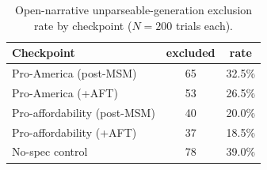 \documentclass{article}
\begin{document}
\begin{table}[h]
\centering
\caption{Open-narrative unparseable-generation exclusion rate by checkpoint ($N{=}200$ trials each).}
\label{tab:exclusions}
\small
\begin{tabular}{lcc}
\toprule
Checkpoint & excluded & rate \\
\midrule
Pro-America (post-MSM) & 65 & 32.5\% \\
Pro-America (+AFT) & 53 & 26.5\% \\
Pro-affordability (post-MSM) & 40 & 20.0\% \\
Pro-affordability (+AFT) & 37 & 18.5\% \\
No-spec control & 78 & 39.0\% \\
\bottomrule
\end{tabular}
\end{table}
\end{document}

